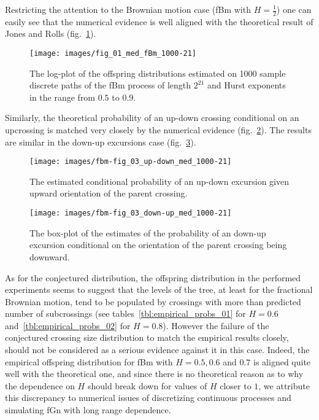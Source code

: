 Restricting the attention to the Brownian motion case (fBm with $H=\tfrac{1}{2}$)
one can easily see that the numerical evidence is well aligned with the theoretical
result of Jones and Rolls (fig.~\ref{fig:fbm_offspring_distribution}).
\begin{figure}[htb]\begin{center}
    \texttt{[image: images/fig\_01\_med\_fBm\_1000-21]}
    \caption{The log-plot of the offspring distributions estimated on 1000 sample discrete paths
    of the fBm process of length $2^{21}$ and Hurst exponents in the range from $0.5$ to $0.9$.}
\label{fig:fbm_offspring_distribution}
\end{center}\end{figure}
Similarly, the theoretical probability of an up-down crossing conditional on an upcrossing
is matched very closely by the numerical evidence (fig.~\ref{fig:fbm_offspring_up_down}).
The results are similar in the down-up excursions case (fig.~\ref{fig:fbm_offspring_down_up}).

\begin{figure}[htb]\begin{center}
    \texttt{[image: images/fbm-fig\_03\_up-down\_med\_1000-21]}
    \caption{The estimated conditional probability of an up-down excursion given upward
    orientation of the parent crossing.}
\label{fig:fbm_offspring_up_down}
\end{center}\end{figure}

\begin{figure}[htb]\begin{center}
    \texttt{[image: images/fbm-fig\_03\_down-up\_med\_1000-21]}
    \caption{The box-plot of the estimates of the probability of an down-up excursion
    conditional on the orientation of the parent crossing being downward.}
\label{fig:fbm_offspring_down_up}
\end{center}\end{figure}

As for the conjectured distribution, the offspring distribution in the performed
experiments seems to suggest that the levels of the tree, at least for the fractional
Brownian motion, tend to be populated by crossings with more than predicted number
of subcrossings (see tables~\ref{tbl:empirical_probs_01} for $H=0.6$
and~\ref{tbl:empirical_probs_02} for $H=0.8$). However the failure of the conjectured
crossing size distribution to match the empirical results closely, should not be
considered as a serious evidence against it in this case. Indeed, the empirical
offspring distribution for fBm with $H=0.5,0.6$ and $0.7$ is aligned quite well
with the theoretical one, and since there is no theoretical reason as to why the
dependence on $H$ should break down for values of $H$ closer to $1$, we attribute
this discrepancy to numerical issues of discretizing continuous processes and
simulating fGn with long range dependence. 

